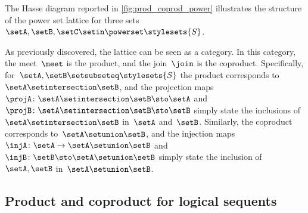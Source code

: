 \begin{marginfigure}
    \centering
    \caption{}
    \label{fig:prod_coprod_power}
\end{marginfigure}

The Hasse diagram reported in \cref{fig:prod_coprod_power} illustrates the structure of the power set lattice for three sets~$\setA,\setB,\setC\setin \powerset \stylesets{S}$.

As previously discovered, the lattice can be seen as a category.
In this category, the meet~$\meet$ is the product, and the join~$\join$ is the coproduct.
Specifically, for~$\setA,\setB\setsubseteq\stylesets{S}$ the product corresponds to~$\setA\setintersection \setB$, and the projection maps~$\projA\colon \setA\setintersection \setB \sto \setA$ and~$\projB\colon \setA\setintersection \setB \sto \setB$ simply state the inclusions of~$\setA\setintersection \setB$ in~$\setA$ and~$\setB$.
Similarly, the coproduct corresponds to~$\setA\setunion \setB$, and the injection maps~$\injA\colon \setA\to \setA\setunion \setB$ and~$\injB\colon \setB \sto \setA\setunion \setB$ simply state the inclusion of~$\setA,\setB$ in~$\setA\setunion \setB$.

\subsection{Product and coproduct for logical sequents}

